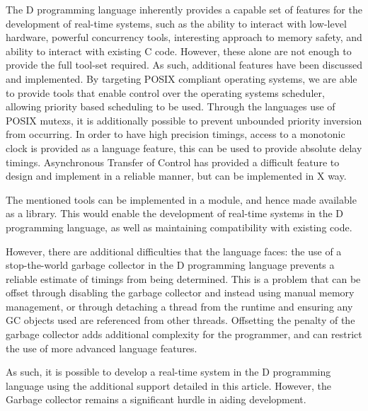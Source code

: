 
The D programming language inherently provides a capable set of features for the 
development of real-time systems, such as the ability to interact with low-level 
hardware, powerful concurrency tools, interesting approach to memory 
safety, and ability to interact with existing C code. 
However, these alone are not enough to provide the full tool-set required. As such, 
additional features have been discussed and implemented. 
By targeting POSIX compliant operating systems, we are 
able to provide tools that enable control over the operating systems scheduler, 
allowing priority based scheduling to be used. 
Through the 
languages use of POSIX mutexs, it is additionally possible to prevent unbounded 
priority inversion from occurring.
In order to have high precision timings, access to a monotonic clock is provided 
as a language feature, this can be used to provide absolute delay timings. 
Asynchronous Transfer of Control has provided a difficult feature to design and 
implement in a reliable manner, but can be implemented in X way.
\par\bigskip\noindent
The mentioned tools can be implemented in a module, and hence made available as 
a library. 
This would enable the development of real-time systems in the D programming 
language, as well as maintaining compatibility with existing code. 

However, there are additional difficulties that the 
language faces: the use of a stop-the-world garbage collector in the 
D programming language prevents a reliable estimate of timings from being determined. 
This is a problem that can be offset through disabling the garbage collector 
and instead using manual memory management, or through detaching a thread from the 
runtime and ensuring any GC objects used are referenced from other threads.
Offsetting the penalty of the garbage collector adds additional complexity for 
the programmer, and can restrict the use of more advanced language features. 
\par\bigskip\noindent
As such, it is possible to develop a real-time system in the D programming 
language using the additional support detailed in this article. However, 
the Garbage collector remains a significant hurdle in aiding development.
